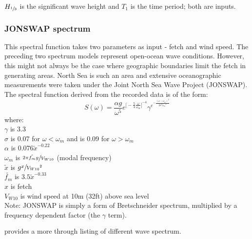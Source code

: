 $H_{\sfrac{1}{3}}$ is the significant wave height and $T_1$ is the time period;
both are inputs.

\subsubsection{JONSWAP spectrum}
This spectral function takes two parameters as input - fetch and wind speed. The 
preceding two spectrum models represent open-ocean wave conditions. However, 
this might not always be the case where geographic boundaries limit the fetch in
generating areas. North Sea is such an area and extensive oceanographic
measurements were taken under the Joint North Sea Wave Project (JONSWAP). The
spectral function derived from the recorded data is of the form: 
\begin{equation}
  S(\omega) = \frac{\alpha g}{\omega^{5}} 
  e^{
    {
    \big[ 
      -\frac{5}{4} \frac{\omega}{\omega_m} 
    \big]
    }^{-4}
  }
  \gamma^{
    e^{
        -\frac{(\omega -\omega_m)^2}{2 \sigma^2 {\omega_m}^2}
      }
    }
  \label {eq: JONSWAP spectrum}
\end{equation}
where:\\
$\gamma$ is 3.3\\
$\sigma$ is 0.07 for $\omega < \omega_m$ and is 0.09 for $\omega > \omega_m$\\
$\alpha$ is $0.076 {\tilde{x}}^{-0.22}$\\
$\omega_m $ is $ \sfrac{2 \pi \tilde{f_m} g}{V_{W10}}$ (modal frequency)\\
$\tilde{x}$ is $g \sfrac{x}{{V_{W10}}^2}$\\
$\tilde{f_m}$ is $3.5 {\tilde{x}}^{-0.33}$ \\
$x$ is fetch \\
$V_{W10}$ is wind speed at 10m (32ft) above sea level\\

Note: JONSWAP is simply a form of Bretschneider spectrum, multiplied by a
frequency dependent factor (the $\gamma$ term).

\cite{stansberg2002specialist} provides a more through listing of different wave
spectrum.


